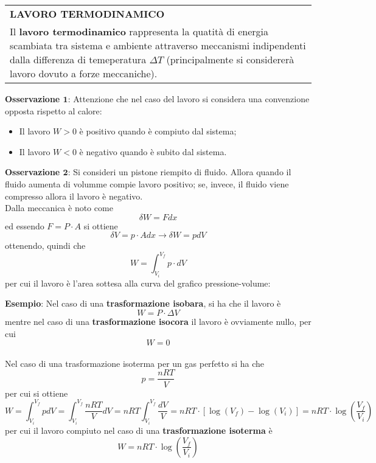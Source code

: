 \documentclass[a4paper]{extarticle}
\renewcommand\arraystretch{}
\begin{document}
\vspace{1em}
\setlength{\tabcolsep}{14pt}
\renewcommand{\arraystretch}{2}
\noindent
\begin{tabularx}{\textwidth}{@{}|P|@{}}
    \hline
    {\textbf{LAVORO TERMODINAMICO}}\\
    \parbox{\linewidth}{Il \textbf{lavoro termodinamico} rappresenta la quatità di energia scambiata tra sistema e ambiente attraverso meccanismi indipendenti dalla differenza di temeperatura $\Delta T$ (principalmente si considererà lavoro dovuto a forze meccaniche).\vspace{3mm}}\\
    \hline
\end{tabularx}

\vspace{1em}
\noindent
\textbf{Osservazione $\boldsymbol{1}$}: Attenzione che nel caso del lavoro si considera una convenzione opposta rispetto al calore:
\begin{itemize}
  \item Il lavoro $W > 0$ è positivo quando è compiuto dal sistema;
  \item Il lavoro $W < 0$ è negativo quando è subito dal sistema.
\end{itemize}

\vspace{1em}
\noindent
\textbf{Osservazione $\boldsymbol{2}$}: Si consideri un pistone riempito di fluido. Allora quando il fluido aumenta di volumme compie lavoro positivo; se, invece, il fluido viene compresso allora il lavoro è negativo.\\
Dalla meccanica è noto come
\[\delta W = F dx\]
ed essendo $F = P \cdot A$ si ottiene
\[\delta V = p \cdot A dx \longrightarrow \delta W = p dV\]
ottenendo, quindi che
\[\boxed{W = \int_{V_i}^{V_f} p \cdot dV}\]
per cui il lavoro è l'area sottesa alla curva del grafico pressione-volume:

\vspace{1em}
\noindent
\textbf{Esempio}: Nel caso di una \textbf{trasformazione isobara}, si ha che il lavoro è
\[\boxed{W=P \cdot \Delta V}\]
mentre nel caso di una \textbf{trasformazione isocora} il lavoro è ovviamente nullo, per cui
\[\boxed{W=0}\]\\
Nel caso di una trasformazione isoterma per un gas perfetto si ha che
\[p=\frac{n R T}{V}\]
per cui si ottiene
\[W = \int_{V_i}^{V_f} p dV = \int_{V_i}^{V_f} \frac{n R T}{V} dV = n R T \int_{V_i}^{V_f} \frac{dV}{V} = n R T \cdot \left[ \log(V_f) - \log(V_i) \right] = n R T \cdot \log \left(\frac{V_f}{V_i}\right)\]
per cui il lavoro compiuto nel caso di una \textbf{trasformazione isoterma} è
\[\boxed{W=n R T \cdot \log \left(\frac{V_f}{V_i}\right)}\]
\end{document}
